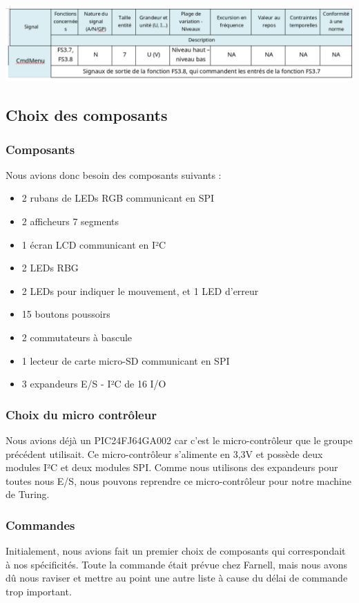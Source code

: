 \documentclass[12pt]{report}
\begin{document}
	\includegraphics[width=\textwidth]{img/s6}
	\subsection{Choix des composants}
	\subsubsection{Composants}
	Nous avions donc besoin des composants suivants :
	\begin{itemize}[label=$-$]
		\item 2 rubans de LEDs RGB communicant en SPI
		\item 2 afficheurs 7 segments
		\item 1 écran LCD communicant en I²C
		\item 2 LEDs RBG
		\item 2 LEDs pour indiquer le mouvement, et 1 LED d'erreur
		\item 15 boutons poussoirs
		\item 2 commutateurs à bascule
		\item 1 lecteur de carte micro-SD communicant en SPI
		\item 3 expandeurs E/S - I²C de 16 I/O
	\end{itemize}
	\subsubsection{Choix du micro contrôleur}
	Nous avions déjà un PIC24FJ64GA002 car c'est le micro-contrôleur que le groupe précédent utilisait. Ce micro-contrôleur s'alimente en 3,3V et possède deux modules I²C et deux modules SPI. Comme nous utilisons des expandeurs pour toutes nous E/S, nous pouvons reprendre ce micro-contrôleur pour notre machine de Turing.\\
	\subsubsection{Commandes}
	Initialement, nous avions fait un premier choix de composants qui correspondait à nos spécificités. Toute la commande était prévue chez Farnell, mais nous avons dû nous raviser et mettre au point une autre liste à cause du délai de commande trop important.\\
\end{document}
